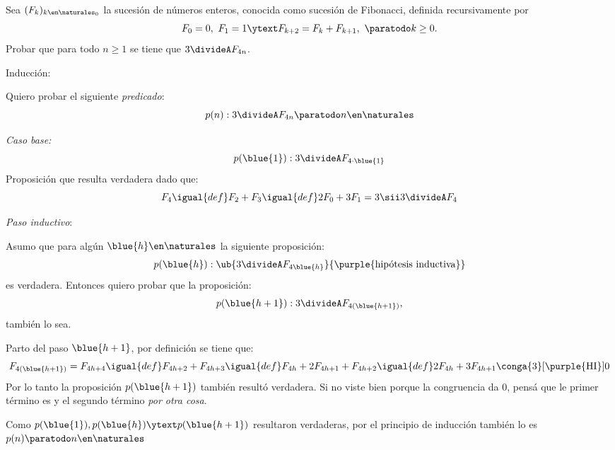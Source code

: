 \begin{enunciado}{\ejExtra}
  Sea $(F_k)_{k\en \naturales_0}$ la sucesión de números enteros, conocida como sucesión de Fibonacci,
  definida recursivamente por
  $$
    F_0 = 0,~ F_1= 1
    \ytext
    F_{k+2} = F_k + F_{k+1},~ \paratodo k \geq 0 .
  $$
  Probar que para todo $n \geq 1$ se tiene que $3 \divideA F_{4n}$.
\end{enunciado}

Inducción:

Quiero probar el siguiente \textit{predicado}:
$$
  p(n) : 3 \divideA F_{4n} \paratodo n \en \naturales
$$

\textit{Caso base:}
$$
  p(\blue{1}) : 3 \divideA F_{4 \cdot \blue{1}}
$$
Proposición que resulta verdadera dado que:
$$
  F_4 \igual{def}
  F_2 + F_3 \igual{def}
  2F_0 + 3F_1 = 3
  \sii
  3 \divideA F_4
$$

\textit{Paso inductivo}:

Asumo que para algún $\blue{h} \en \naturales$ la siguiente proposición:
$$
  p(\blue{h}) :
  \ub{
    3 \divideA F_{4\blue{h}}
  }{
    \text{\purple{hipótesis inductiva}}
  }
$$
es verdadera. Entonces quiero probar que la proposición:
$$
  p(\blue{h+1}) : 3 \divideA F_{4(\blue{h+1})},
$$
también lo sea.

\medskip

Parto del paso $\blue{h+1}$, por definición se tiene que:
$$
  F_{4(\blue{h+1})} =
  F_{4h+4} \igual{def}
  F_{4h+2} + F_{4h+3} \igual{def}
  F_{4h} + 2F_{4h+1} + F_{4h+2} \igual{def}
  2F_{4h} + 3F_{4h+1} \conga{3}[\text{\purple{HI}}] 0
$$
Por lo tanto la proposición $p(\blue{h+1})$ también resultó verdadera. Si no viste bien porque la congruencia da 0, pensá que le primer
término es \textit{} y el segundo término \textit{por otra cosa}.

Como
$p(\blue{1}), p(\blue{h}) \ytext p(\blue{h + 1})$ resultaron verdaderas, por el principio de inducción también
lo es $p(n) \paratodo n \en \naturales$

\begin{aportes}
  \item {}
\end{aportes}
